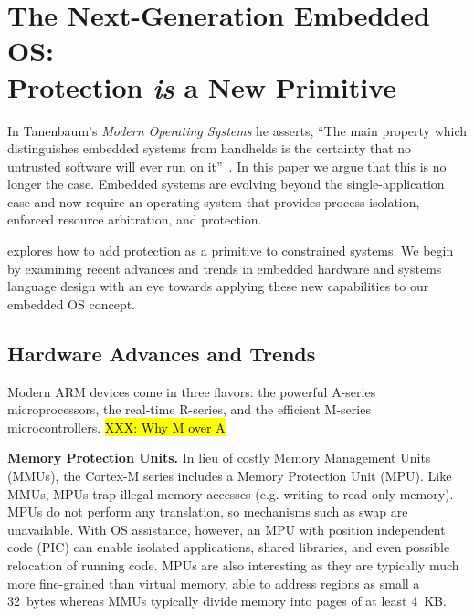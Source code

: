 \section{The Next-Generation Embedded OS:\\Protection \emph{is} a New Primitive}
\label{protection}

In Tanenbaum's \emph{Modern Operating Systems} he asserts, ``The main property
which distinguishes embedded systems from handhelds is the certainty that no
untrusted software will ever run on it''~\cite{tanenbaum}. In this paper we
argue that this is no longer the case.
Embedded systems
are evolving beyond the single-application case and now
require an operating system that provides process isolation, enforced resource
arbitration, and protection.

\name explores how to add protection as a primitive to constrained
systems.
We begin by examining recent advances and trends in embedded
hardware and systems language design with an eye towards applying these
new capabilities to our embedded OS concept.


%
%

\subsection{Hardware Advances and Trends}

Modern ARM devices come in three flavors: the powerful A-series
microprocessors, the real-time R-series, and the efficient M-series
microcontrollers.
\hl{XXX: Why M over A}

{\bf Memory Protection Units.}
In lieu of costly Memory Management Units (MMUs), the Cortex-M series includes
a Memory Protection Unit (MPU). Like MMUs, MPUs trap illegal memory accesses
(e.g. writing to read-only memory). MPUs do not perform any translation, so
mechanisms such as swap are unavailable. With OS assistance, however, an MPU
with position independent code (PIC) can enable isolated applications, shared
libraries, and even possible relocation of running code.
MPUs are also interesting as they are typically much more fine-grained than
virtual memory, able to address regions as small a 32~bytes whereas MMUs
typically divide memory into pages of at least 4~KB.

